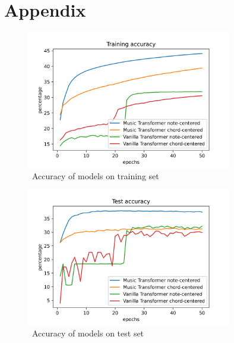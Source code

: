\chapter{Appendix}

\begin{figure}
    \centering
    \includegraphics[width=0.8\textwidth]{assets/training-accuracy}
    \caption{~Accuracy of models on training set}\label{fig:appendix-training-accuracy}
\end{figure}
\begin{figure}
    \centering
    \includegraphics[width=0.8\textwidth]{assets/test-accuracy}
    \caption{~Accuracy of models on test set}\label{fig:appendix-test-accuracy}
\end{figure}

